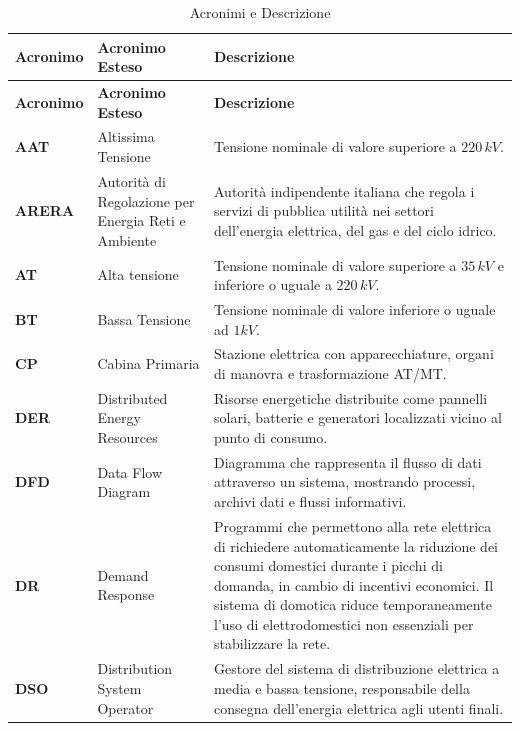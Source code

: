 \begin{longtable}{p{2cm}p{3.5cm}p{10.5cm}}

    \caption{Acronimi e Descrizione} \\
    
    \hline
    \textbf{Acronimo}& \textbf{Acronimo Esteso} & \textbf{Descrizione}\\
    \hline
    \endfirsthead
    
    \hline
    \textbf{Acronimo}& \textbf{Acronimo Esteso} & \textbf{Descrizione}\\
    \hline
    \endhead

    \textbf{AAT} & Altissima Tensione &  Tensione nominale di valore superiore a $220\,kV$. \\

    \textbf{ARERA} & Autorità di Regolazione per Energia Reti e Ambiente & Autorità indipendente italiana che regola i servizi di pubblica utilità nei settori dell'energia elettrica, del gas e del ciclo idrico. \\

    \textbf{AT} & Alta tensione &  Tensione nominale di valore superiore a $35\,kV$ e  inferiore o uguale a $220\,kV$. \\

    \textbf{BT} & Bassa Tensione &  Tensione nominale di valore inferiore o uguale ad $1 kV$.  \\

    \textbf{CP} & Cabina Primaria &  Stazione elettrica con apparecchiature, organi di manovra e trasformazione AT/MT. \\

    \textbf{DER} &  Distributed Energy Resources & Risorse energetiche distribuite come pannelli solari, batterie e generatori localizzati vicino al punto di consumo.\\

    \textbf{DFD} & Data Flow Diagram & Diagramma che rappresenta il flusso di dati attraverso un sistema, mostrando processi, archivi dati e flussi informativi. \\

    \textbf{DR} &  Demand Response & Programmi che permettono alla rete elettrica di richiedere automaticamente la riduzione dei consumi domestici durante i picchi di domanda, in cambio di incentivi economici. Il sistema di domotica riduce temporaneamente l'uso di elettrodomestici non essenziali per stabilizzare la rete. \\

    \textbf{DSO} &  Distribution System Operator &  Gestore del sistema di distribuzione elettrica a media e bassa tensione, responsabile della consegna dell'energia elettrica agli utenti finali. \\


\end{longtable}
